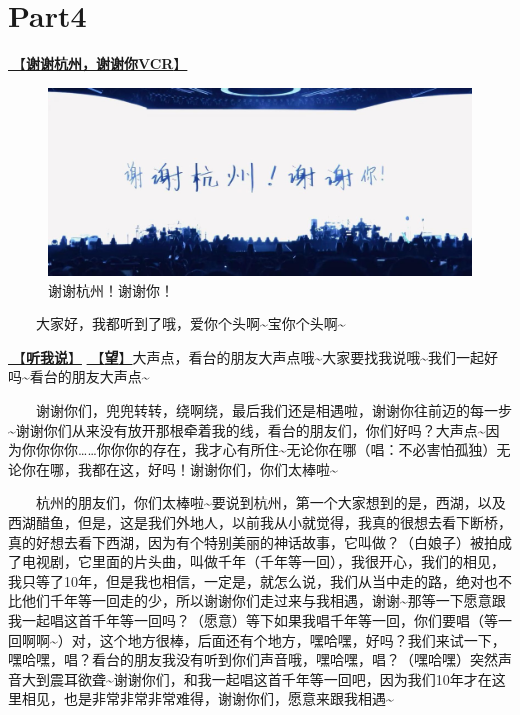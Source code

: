 \documentclass[]{ctexbook}
\begin{document}
\section{Part4}\label{hangzhou-20240823-part4}

\hyperref[thank-you-vcr]{🎥【\textbf{谢谢杭州，谢谢你VCR}】}

\begin{figure}

{\centering \includegraphics[width=400pt]{img/hangzhou20240823/thank-hangzhou} 

}

\caption{谢谢杭州！谢谢你！}\label{fig:unnamed-chunk-84}
\end{figure}

  大家好，我都听到了哦，爱你个头啊\textasciitilde 宝你个头啊\textasciitilde{}

\hyperref[listen-to-me]{🎵【\textbf{听我说}】} \hyperref[Gaze]{🎵【\textbf{望}】}大声点，看台的朋友大声点哦\textasciitilde 大家要找我说哦\textasciitilde 我们一起好吗\textasciitilde 看台的朋友大声点\textasciitilde{}

  谢谢你们，兜兜转转，绕啊绕，最后我们还是相遇啦，谢谢你往前迈的每一步\textasciitilde 谢谢你们从来没有放开那根牵着我的线，看台的朋友们，你们好吗？大声点\textasciitilde 因为你你你你\ldots\ldots 你你你的存在，我才心有所住\textasciitilde 无论你在哪（唱：不必害怕孤独）无论你在哪，我都在这，好吗！谢谢你们，你们太棒啦\textasciitilde{}

  杭州的朋友们，你们太棒啦\textasciitilde 要说到杭州，第一个大家想到的是，西湖，以及西湖醋鱼，但是，这是我们外地人，以前我从小就觉得，我真的很想去看下断桥，真的好想去看下西湖，因为有个特别美丽的神话故事，它叫做？（白娘子）被拍成了电视剧，它里面的片头曲，叫做千年（千年等一回），我很开心，我们的相见，我只等了10年，但是我也相信，一定是，就怎么说，我们从当中走的路，绝对也不比他们千年等一回走的少，所以谢谢你们走过来与我相遇，谢谢\textasciitilde 那等一下愿意跟我一起唱这首千年等一回吗？（愿意）等下如果我唱千年等一回，你们要唱（等一回啊啊\textasciitilde）对，这个地方很棒，后面还有个地方，嘿哈嘿，好吗？我们来试一下，嘿哈嘿，唱？看台的朋友我没有听到你们声音哦，嘿哈嘿，唱？（嘿哈嘿）突然声音大到震耳欲聋\textasciitilde 谢谢你们，和我一起唱这首千年等一回吧，因为我们10年才在这里相见，也是非常非常非常难得，谢谢你们，愿意来跟我相遇\textasciitilde{}
\end{document}
